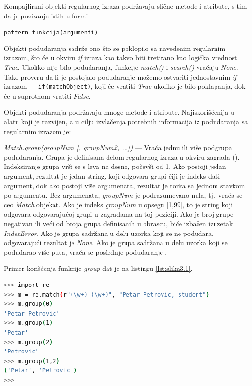 \documentclass[12pt,oneside]{memoir}
\theoremstyle{plain}
\theoremstyle{definition}
\begin{document}
Kompajlirani objekti regularnog izraza podržavaju slične metode i atribute, s tim da je pozivanje istih u formi
\begin{center}
\texttt{pattern.funkcija(argumenti).}
\end{center}

Objekti podudaranja sadrže ono što se poklopilo sa navedenim regularnim izrazom, što će u okviru \textit{if} izraza kao takvo biti tretirano kao logička vrednost \textit{True}. Ukoliko nije bilo podudaranja, funkcije \textit{match()} i \textit{search()} vraćaju \textit{None}. 
Tako proveru da li je postojalo podudaranje možemo ostvariti jednostavnim \textit{if} izrazom --- \texttt{if(matchObject)}, koji će vratiti \textit{True} ukoliko je bilo poklapanja, dok će u suprotnom vratiti \textit{False}.

Objekti podudaranja podržavaju mnoge metode i atribute. Najiskorišćenija u alatu koji je razvijen, a u cilju izvlačenja potrebnih informacija iz podudaranja sa regularnim izrazom je:
\begin{description}
\item \textit{Match.group(groupNum [, groupNum2, ...])} --- Vraća jednu ili više podgrupa podudaranja. Grupa je definisana delom regularnog izraza u okviru zagrada (). Indeksiranje grupa vrši se s leva na desno, počevši od 1. Ako postoji jedan argument, rezultat je jedan string, koji odgovara grupi čiji je indeks dati argument, dok ako postoji više argumenata, rezultat je torka sa jednom stavkom po argumentu. Bez argumenata, \textit{groupNum} je  podrazumevano nula, tj.~vraća se ceo \textit{Match} objekat. Ako je indeks \textit{groupNum} u opsegu [1,99], to je string koji odgovara odgovarajućoj grupi u zagradama na toj poziciji. Ako je broj grupe negativan ili veći od broja grupa definisanih u obrascu, biće izbačen izuzetak \textit{IndexError}. Ako je grupa sadržana u delu uzorka koji se ne podudara, odgovarajući rezultat je \textit{None}. Ako je grupa sadržana u delu uzorka koji se podudarao više puta, vraća se poslednje podudaranje \cite{reModule}.
\end{description}

Primer korišćenja funkcije \textit{group} dat je na listingu \ref{lst:slika3.1}.

\begin{lstlisting}[style=terminal,caption={Primer korišćenja funkcije \textit{group} modula \textit{re}}, label={lst:slika3.1},language={bash}] 
>>> import re
>>> m = re.match(r"(\w+) (\w+)", "Petar Petrovic, student")
>>> m.group(0)
'Petar Petrovic'
>>> m.group(1)
'Petar'
>>> m.group(2)
'Petrovic'
>>> m.group(1,2)
('Petar', 'Petrovic')
>>>
\end{lstlisting}
\end{document}
